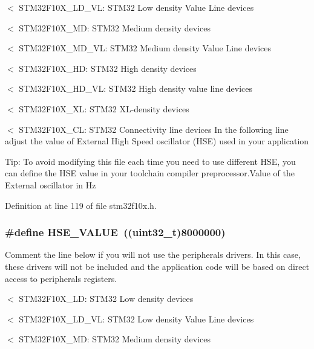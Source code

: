 $<$ S\+T\+M32\+F10\+X\+\_\+\+L\+D\+\_\+\+VL\+: S\+T\+M32 Low density Value Line devices

$<$ S\+T\+M32\+F10\+X\+\_\+\+MD\+: S\+T\+M32 Medium density devices

$<$ S\+T\+M32\+F10\+X\+\_\+\+M\+D\+\_\+\+VL\+: S\+T\+M32 Medium density Value Line devices

$<$ S\+T\+M32\+F10\+X\+\_\+\+HD\+: S\+T\+M32 High density devices

$<$ S\+T\+M32\+F10\+X\+\_\+\+H\+D\+\_\+\+VL\+: S\+T\+M32 High density value line devices

$<$ S\+T\+M32\+F10\+X\+\_\+\+XL\+: S\+T\+M32 X\+L-\/density devices

$<$ S\+T\+M32\+F10\+X\+\_\+\+CL\+: S\+T\+M32 Connectivity line devices In the following line adjust the value of External High Speed oscillator (H\+SE) used in your application

Tip\+: To avoid modifying this file each time you need to use different H\+SE, you can define the H\+SE value in your toolchain compiler preprocessor.\+Value of the External oscillator in Hz 

Definition at line 119 of file stm32f10x.\+h.

\subsubsection[{\texorpdfstring{H\+S\+E\+\_\+\+V\+A\+L\+UE}{HSE_VALUE}}]{\setlength{\rightskip}{0pt plus 5cm}\#define H\+S\+E\+\_\+\+V\+A\+L\+UE~(({\bf uint32\+\_\+t})8000000)}\hypertarget{group___library__configuration__section_gaeafcff4f57440c60e64812dddd13e7cb}{}\label{group___library__configuration__section_gaeafcff4f57440c60e64812dddd13e7cb}


Comment the line below if you will not use the peripherals drivers. In this case, these drivers will not be included and the application code will be based on direct access to peripherals registers. 

$<$ S\+T\+M32\+F10\+X\+\_\+\+LD\+: S\+T\+M32 Low density devices

$<$ S\+T\+M32\+F10\+X\+\_\+\+L\+D\+\_\+\+VL\+: S\+T\+M32 Low density Value Line devices

$<$ S\+T\+M32\+F10\+X\+\_\+\+MD\+: S\+T\+M32 Medium density devices

